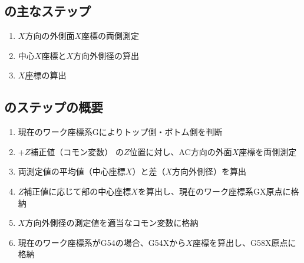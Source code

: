\subsection{\MXOThickness の主なステップ}
\begin{enumerate}[label*=\sarrow]
\item $X$方向の外側面$X$座標の両側測定
\item 中心$X$座標と$X$方向外側径の算出
\item \KeywayCenter$X$座標の算出
\end{enumerate}


\subsection{\MXOThickness のステップの概要}
\begin{enumerate}[label*=\sarrow]
\item 現在のワーク座標系{\ttfamily G\ttNum}によりトップ側・ボトム側を判断
\item \ReAlocationLength+$Z$補正値（コモン変数） の$Z$位置に対し、AC方向の外面$X$座標を両側測定
\item 両測定値の平均値（中心座標$X$）と差（$X$方向外側径）を算出
\item $Z$補正値に応じて\EndFace 部の中心座標$X$を算出し、現在のワーク座標系{\ttfamily G\ttNum\;X}原点に格納
\item $X$方向外側径の測定値を適当なコモン変数に格納
\item 現在のワーク座標系が{\ttfamily G54}の場合、{\ttfamily G54\;X}から\KeywayCenter $X$座標を算出し、{\ttfamily G58\;X}原点に格納
\end{enumerate}



\clearpage


